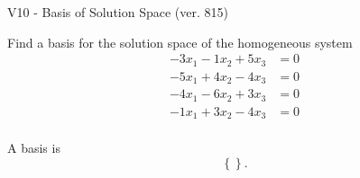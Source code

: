 \begin{exercise}
  \begin{exerciseTitle}V10 - Basis of Solution Space (ver. 815)\end{exerciseTitle}
  \begin{exerciseStatement}
    Find a basis for the solution space of the homogeneous system 
\begin{align*}
 -3 x_ 1 -1 x_ 2 + 5 x_ 3 &= 0  \\ 
  -5 x_ 1 + 4 x_ 2 -4 x_ 3 &= 0  \\ 
  -4 x_ 1 -6 x_ 2 + 3 x_ 3 &= 0  \\ 
  -1 x_ 1 + 3 x_ 2 -4 x_ 3 &= 0  \\ 
 \end{align*}


 
  \end{exerciseStatement}

  \begin{exerciseAnswer}
   A basis is   
\[\left\{\right\}.\]

  


  \end{exerciseAnswer}
\end{exercise}